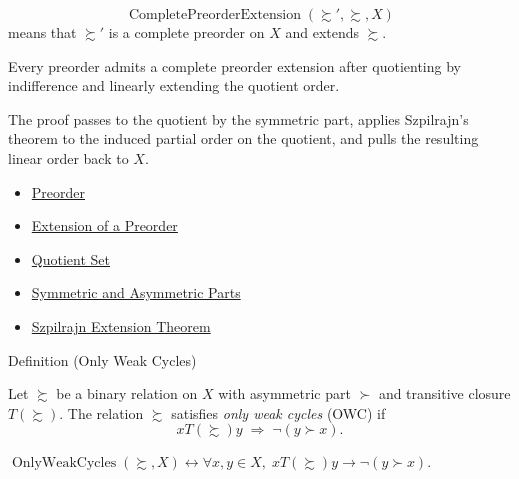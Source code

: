 \begin{remark*}
\[
  \operatorname{CompletePreorderExtension}(\succsim',\succsim,X)
\] means that
$\succsim'$ is a complete preorder on $X$ and extends $\succsim$.
\end{remark*}

\begin{remark*}[Interpretation]
Every preorder admits a complete preorder extension after quotienting by
indifference and linearly extending the quotient order.
\end{remark*}

\begin{remark*}[Exposition]
The proof passes to the quotient by the symmetric part, applies Szpilrajn's
theorem to the induced partial order on the quotient, and pulls the resulting
linear order back to $X$.
\end{remark*}

\begin{dependencies}
\begin{itemize}
  \item \hyperref[def:preorder]{Preorder}
  \item \hyperref[def:preorder-extension]{Extension of a Preorder}
  \item \hyperref[def:quotient-set]{Quotient Set}
  \item \hyperref[def:sym-asym]{Symmetric and Asymmetric Parts}
  \item \hyperref[thm:szpilrajn]{Szpilrajn Extension Theorem}
\end{itemize}
\end{dependencies}


\begin{definitionbox}{Definition (Only Weak Cycles)}
\begin{definition}\label{def:owc}
Let $\succsim$ be a binary relation on $X$ with asymmetric part $\succ$ and
transitive closure $T(\succsim)$. The relation $\succsim$ satisfies
\emph{only weak cycles} (OWC) if
\[
  xT(\succsim)y \;\Rightarrow\; \neg(y \succ x).
\]
\end{definition}
\end{definitionbox}

\begin{remark*}
$\operatorname{OnlyWeakCycles}(\succsim,X)\leftrightarrow
\forall x,y\in X,\; xT(\succsim)y\to\neg(y\succ x)$.
\end{remark*}

